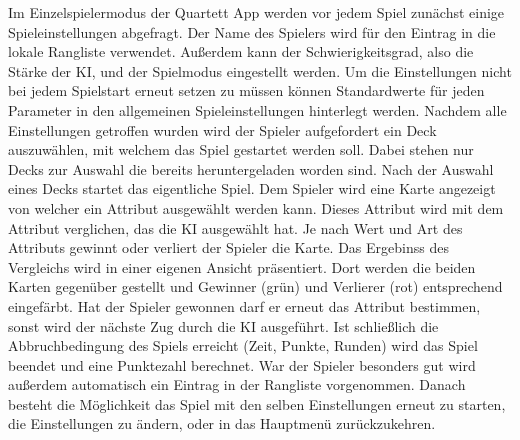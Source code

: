 \documentclass{scrartcl}
\begin{document}
\noindent
Im Einzelspielermodus der Quartett App werden vor jedem Spiel zunächst einige
Spieleinstellungen abgefragt. Der Name des Spielers wird für den Eintrag in die
lokale Rangliste verwendet. Außerdem kann der Schwierigkeitsgrad, also die
Stärke der KI, und der Spielmodus eingestellt werden. Um die Einstellungen nicht
bei jedem Spielstart erneut setzen zu müssen können Standardwerte für jeden
Parameter in den allgemeinen Spieleinstellungen hinterlegt werden. Nachdem alle
Einstellungen getroffen wurden wird der Spieler aufgefordert ein Deck
auszuwählen, mit welchem das Spiel gestartet werden soll. Dabei stehen nur Decks
zur Auswahl die bereits heruntergeladen worden sind. Nach der Auswahl eines
Decks startet das eigentliche Spiel. Dem Spieler wird eine Karte angezeigt von
welcher ein Attribut ausgewählt werden kann. Dieses Attribut wird mit dem
Attribut verglichen, das die KI ausgewählt hat. Je nach Wert und Art des
Attributs gewinnt oder verliert der Spieler die Karte. Das Ergebinss des
Vergleichs wird in einer eigenen Ansicht präsentiert. Dort werden die beiden
Karten gegenüber gestellt und Gewinner (grün) und Verlierer (rot) entsprechend
eingefärbt. Hat der Spieler gewonnen darf er erneut das Attribut bestimmen,
sonst wird der nächste Zug durch die KI ausgeführt. Ist schließlich die
Abbruchbedingung des Spiels erreicht (Zeit, Punkte, Runden) wird das Spiel
beendet und eine Punktezahl berechnet. War der Spieler besonders gut wird
außerdem automatisch ein Eintrag in der Rangliste vorgenommen. Danach besteht
die Möglichkeit das Spiel mit den selben Einstellungen erneut zu starten, die
Einstellungen zu ändern, oder in das Hauptmenü zurückzukehren.
\end{document}
